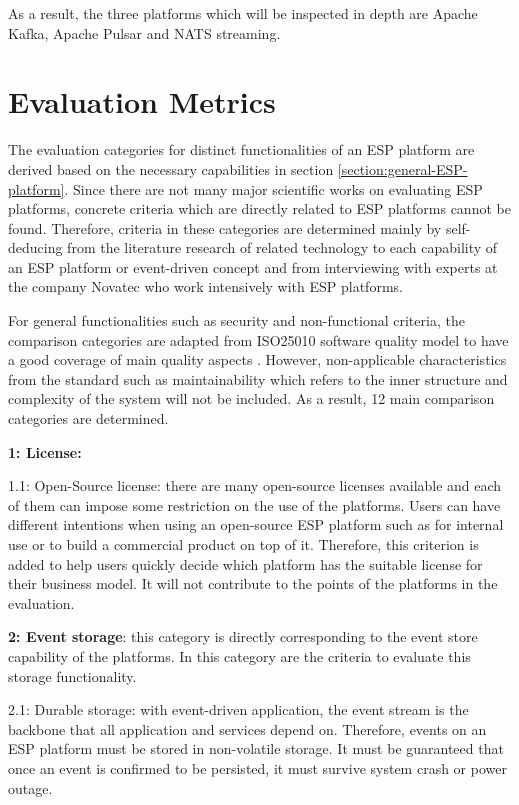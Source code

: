 As a result, the three platforms which will be inspected in depth are Apache Kafka, Apache Pulsar and NATS streaming.

\section{Evaluation Metrics}
The evaluation categories for distinct functionalities of an ESP platform are derived based on the necessary capabilities in section \ref{section:general-ESP-platform}. Since there are not many major scientific works on evaluating ESP platforms, concrete criteria which are directly related to ESP platforms cannot be found. Therefore, criteria in these categories are determined mainly by self-deducing from the literature research of related technology to each capability of an ESP platform or event-driven concept and from interviewing with experts at the company Novatec who work intensively with ESP platforms.

For general functionalities such as security and non-functional criteria, the comparison categories are adapted from ISO25010 software quality model to have a good coverage of main quality aspects \cite{iso25010}. However, non-applicable characteristics from the standard such as maintainability which refers to the inner structure and complexity of the system will not be included. As a result, 12 main comparison categories are determined. 

\textbf{1: License:}

1.1: Open-Source license: there are many open-source licenses available and each of them can impose some restriction on the use of the platforms. Users can have different intentions when using an open-source ESP platform such as for internal use or to build a commercial product on top of it. Therefore, this criterion is added to help users quickly decide which platform has the suitable license for their business model. It will not contribute to the points of the platforms in the evaluation. 

\textbf{2: Event storage}: this category is directly corresponding to the event store capability of the platforms. In this category are the criteria to evaluate this storage functionality.

2.1: Durable storage: with event-driven application, the event stream is the backbone that all application and services depend on. Therefore, events on an ESP platform must be stored in non-volatile storage. It must be guaranteed that once an event is confirmed to be persisted, it must survive system crash or power outage.

